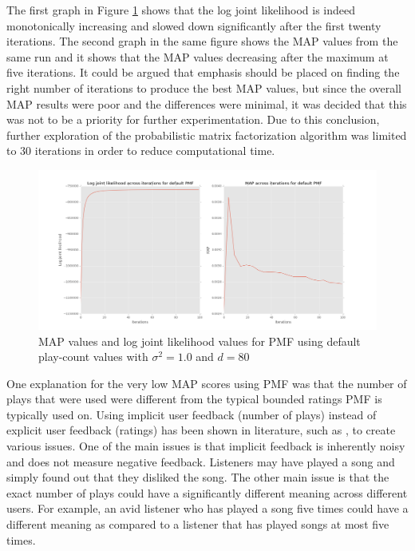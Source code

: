 \documentclass[11pt,preprint]{aastex}
\begin{document}
The first graph in Figure \ref{defaultPMF} shows that the log joint likelihood is indeed monotonically increasing and slowed down significantly after the first twenty iterations. The second graph in the same figure shows the MAP values from the same run and it shows that the MAP values decreasing after the maximum at five iterations. It could be argued that emphasis should be placed on finding the right number of iterations to produce the best MAP values, but since the overall MAP results were poor and the differences were minimal, it was decided that this was not to be a priority for further experimentation. Due to this conclusion, further exploration of the probabilistic matrix factorization algorithm was limited to 30 iterations in order to reduce computational time.

\begin{figure}[H] %
   \centering
   \includegraphics[width=6in]{../plots/final/defaultPMF.png} 
   \caption{MAP values and log joint likelihood values for PMF using default play-count values with $\sigma^2 = 1.0$ and $d = 80$}
   \label{defaultPMF}
\end{figure}
 
One explanation for the very low MAP scores using PMF was that the number of plays that were used were different from the typical bounded ratings PMF is typically used on. Using implicit user feedback (number of plays) instead of explicit user feedback (ratings) has been shown in literature, such as \citet{hu2008collaborative}, to create various issues. One of the main issues is that implicit feedback is inherently noisy and does not measure negative feedback. Listeners may have played a song and simply found out that they disliked the song. The other main issue is that the exact number of plays could have a significantly different meaning across different users. For example, an avid listener who has played a song five times could have a different meaning as compared to a listener that has played songs at most five times.
 
\end{document}
